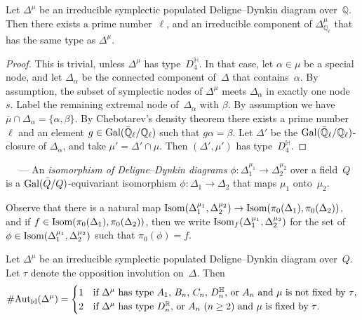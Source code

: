 \documentclass[10pt,twoside,leqno]{article}
\renewcommand{\paragraph}[1]{\par\bigskip\refstepcounter{subsection}%
 {\normalfont\normalsize\scshape\noindent\thesubsection%
 \ifthenelse{\equal{#1}{}}%
 {}%
 {\ \textls{#1.}}%
 \ ---}%
}
\numberwithin{equation}{subsection}
\newcommand{\id}{\textnormal{id}}
\newcommand{\Isom}{\textnormal{Isom}}
\newcommand{\Aut}{\textnormal{Aut}}
\newcommand{\QQ}{\mathbb{Q}}
\newcommand{\QQbar}{\bar{\QQ}}
\newcommand{\QQl}{\QQ_{\ell}}
\newcommand{\QQlbar}{\QQbar_{\ell}}
\newcommand{\RR}{\mathbb{R}}
\newcommand{\HQ}{\mathbb{H}}
\newcommand{\Gal}{\textnormal{Gal}}
\begin{document}
\begin{lemma} %
 \label{locally-same-type}
 Let $\Delta^{\mu}$ be
 an irreducible symplectic populated Deligne--Dynkin diagram over~$\QQ$.
 Then there exists a prime number~$\ell$,
 and an irreducible component of $\Delta^{\mu}_{\QQl}$
 that has the same type as $\Delta^{\mu}$.
 \begin{proof}
  This is trivial, unless $\Delta^{\mu}$ has type~$D_4^\HQ$.
  In that case, let $\alpha \in \mu$ be a special node,
  and let $\Delta_\alpha$ be
  the connected component of~$\Delta$ that contains~$\alpha$.
  By assumption, the subset of symplectic nodes of $\Delta^{\mu}$
  meets $\Delta_\alpha$ in exactly one node~$s$.
  Label the remaining extremal node of~$\Delta_\alpha$ with $\beta$.
  By assumption we have $\bar\mu \cap \Delta_\alpha = \{\alpha,\beta\}$.
  By Chebotarev's density theorem
  there exists a prime number~$\ell$
  and an element $g \in \Gal(\QQlbar/\QQl)$ such that $g\alpha = \beta$.
  Let $\Delta'$ be the $\Gal(\QQlbar/\QQl)$-closure of $\Delta_\alpha$,
  and take $\mu' = \Delta' \cap \mu$.
  Then $(\Delta', \mu')$ has type~$D_4^\HQ$.
 \end{proof}
\end{lemma}

\paragraph{} %
An \emph{isomorphism of Deligne--Dynkin diagrams}
$\phi \colon \Delta_1^{\mu_1} \to \Delta_2^{\mu_2}$ over a field~$Q$
is a $\Gal(\bar Q/Q)$-equivariant isomorphism
$\phi \colon \Delta_1 \to \Delta_2$ that maps $\mu_1$ onto~$\mu_2$.

Observe that there is a natural map
$\Isom(\Delta_1^{\mu_1},\Delta_2^{\mu_2})
\to \Isom(\pi_0(\Delta_1),\pi_0(\Delta_2))$,
and if $f \in \Isom(\pi_0(\Delta_1),\pi_0(\Delta_2))$,
then we write $\Isom_f(\Delta_1^{\mu_1},\Delta_2^{\mu_2})$
for the set of $\phi \in \Isom(\Delta_1^{\mu_1},\Delta_2^{\mu_2})$
such that $\pi_0(\phi) = f$.

\begin{lemma} %
 Let $\Delta^{\mu}$ be
 an irreducible symplectic populated Deligne--Dynkin diagram over~$Q$.
 Let $\tau$ denote the opposition involution on~$\Delta$.
 Then
 \[
  \#\Aut_\id(\Delta^\mu) =
  \begin{cases}
   1 &\text{if $\Delta^\mu$ has type $A_1$,~$B_n$, $C_n$, $D_n^\HQ$,
   or $A_n$ and $\mu$ is not fixed by~$\tau$,}\\
   2 &\text{if $\Delta^\mu$ has type $D_n^\RR$, or $A_n$ ($n \ge 2$)
    and $\mu$ is fixed by~$\tau$.}
  \end{cases}
 \]
\end{lemma}
\end{document}
